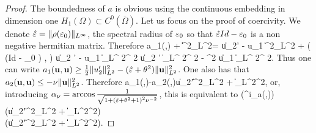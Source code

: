 \begin{proof}
	The boundedness of $a$ is obvious using the continuous embedding in dimension
	one  $H_1(\Omega)\subset C^0(\overline \Omega)$. Let us focus on the proof of coercivity. 
	We denote ${\hat{{\bf \varepsilon}}} =  \|\rho({\bf \varepsilon}_0)\|_{L^\infty}$, the spectral radius of ${\bf \varepsilon}_0$ so that
	${\hat{{\bf \varepsilon}}} Id- {\bf \varepsilon}_0 $ is a non negative hermitian matrix.
	Therefore
	\be 
	a_1(\ubf,\ubf) + \heps\|\ubf\|^2_{L^2}= \|u_2' - \imath \theta u_1 \|^2_{L^2} + \left( (\heps Id - \eps_0 ) \ubf, \overline{\ubf} \right)  \geq \|u_2 ' - \imath \theta u_1 \|_{L^ 2}^ 2
	\geq {} \|u_2 '  \|_{L^ 2}^ 2 -
	\theta ^2 \| u_1 \|_{L^ 2}^ 2.
	\ee
	Thus one can write
	$
	a_1({\bf u},{\bf u})  \geq \frac{1}{2}\|u_2'\|^2_{L^2}-  ({\hat{{\bf \varepsilon}}}  +  \theta^2) \| {\bf u} \|_{L^2}^2$.
	One also has that
	$
	a_2 ({\bf u} ,{\bf u}) \leq -\nu \| {\bf u} \|_{L^2}^2$. 
	Therefore
	\ben
	a_1(\ubf,\ubf)-\nu a_2(\ubf,\ubf)\geq {}\|u_2'\|^2_{L^2}  + \| \ubf \|_{L^2}^2,
	\een
	or, introducing $\alpha_{\nu}=\arccos\frac{1}{\sqrt{1+\left({\hat{{\bf \varepsilon}}}+\theta^2+1\right)^2\nu^{-2}}}$, this is equivalent to 
	\ben
	\Re\left(^{i\alpha_{\nu}}a(\ubf,\ubf)\right)\geq 
	 \left(\|u_2'\|^2_{L^2}  + \| \ubf \|_{L^2}^2\right)\\
	\geq {}\left(\|u_2'\|^2_{L^2}  + \| \ubf \|_{L^2}^2\right).
	\een
	

\end{proof}
